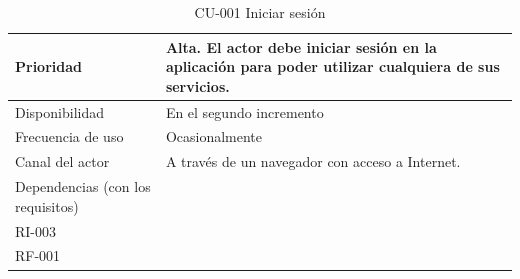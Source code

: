 \begin{table}[htpb]
\begin{tabularx}{\textwidth}{|l|X|}
Prioridad                         & Alta. El actor debe iniciar sesión en la aplicación para poder utilizar cualquiera de sus servicios.                                                                                                                                             \\ \hline
Disponibilidad                    & En el segundo incremento                                                                                                                                                                                                                         \\ \hline
Frecuencia de uso                 & Ocasionalmente                                                                                                                                                                                                                                   \\ \hline
Canal del actor                   & A través de un navegador con acceso a Internet.                                                                                                                                                                                                  \\ \hline
Dependencias (con los requisitos) & \begin{tabular}[c]{@{}l@{}}RI-001\\ RI-003\\ RF-001\end{tabular}                                                                                                                                                                                 \\ \hline
\end{tabularx}
\caption{CU-001 Iniciar sesión}
\end{table}


